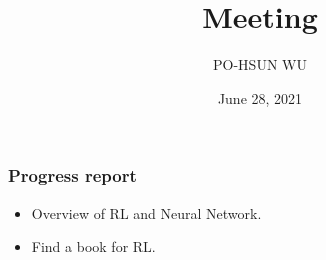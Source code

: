 \documentclass{beamer}
\date{June 28, 2021}
\title{Meeting}
\author{PO-HSUN WU}
\begin{document}
    \frame{\titlepage}

    \begin{frame}
        \frametitle{Progress report}

        \begin{itemize}
            \item Overview of RL and Neural Network.
            \item Find a book for RL.
        \end{itemize}
    \end{frame}
\end{document}
